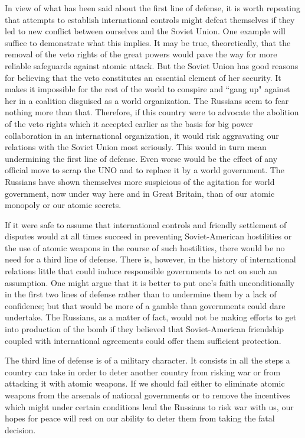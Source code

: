 In view of what has been said about the first line of defense, it is worth repeating that attempts to establish international controls might defeat themselves if they led to new conflict between ourselves and the Soviet Union. One example will suffice to demonstrate what this implies. It may be true, theoretically, that the removal of the veto rights of the great powers would pave the way for more reliable safeguards against atomic attack. But the Soviet Union has good reasons for believing that the veto constitutes an essential element of her security. It makes it impossible for the rest of the world to conspire and ``gang up" against her in a coalition disguised as a world organization. The Russians seem to fear nothing more than that. Therefore, if this country were to advocate the abolition of the veto rights which it accepted earlier as the basis for big power collaboration in an international organization, it would risk aggravating our relations with the Soviet Union most seriously. This would in turn mean undermining the first line of defense. Even worse would be the effect of any official move to scrap the UNO and to replace it by a world government. The Russians have shown themselves more suspicious of the agitation for world government, now under way here and in Great Britain, than of our atomic monopoly or our atomic secrets.

If it were safe to assume that international controls and friendly settlement of disputes would at all times succeed in preventing Soviet-American hostilities or the use of atomic weapons in the course of such hostilities, there would be no need for a third line of defense. There is, however, in the history of international relations little that could induce responsible governments to act on such an assumption. One might argue that it is better to put one's faith unconditionally in the first two lines of defense rather than to undermine them by a lack of confidence; but that would be more of a gamble than governments could dare undertake. The Russians, as a matter of fact, would not be making efforts to get into production of the bomb if they believed that Soviet-American friendship coupled with international agreements could offer them sufficient protection.

The third line of defense is of a military character. It consists in all the steps a country can take in order to deter another country from risking war or from attacking it with atomic weapons. If we should fail either to eliminate atomic weapons from the arsenals of national governments or to remove the incentives which might under certain conditions lead the Russians to risk war with us, our hopes for peace will rest on our ability to deter them from taking the fatal decision.

